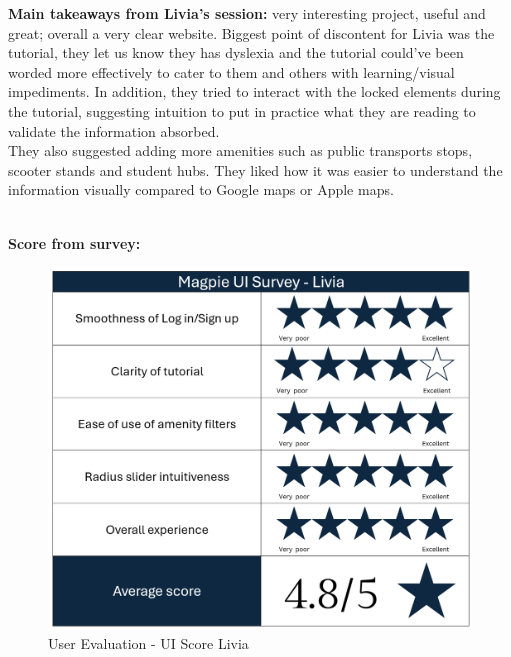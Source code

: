 \noindent\textbf{Main takeaways from Livia's session: }very interesting project, useful and great; overall a very clear website. Biggest point of discontent for Livia was the tutorial, they let us know they has dyslexia and the tutorial could've been worded more effectively to cater to them and others with learning/visual impediments. In addition, they tried to interact with the locked elements during the tutorial, suggesting intuition to put in practice what they are reading to validate the information absorbed.\\
They also suggested adding more amenities such as public transports stops, scooter stands and student hubs. They liked how it was easier to understand the information visually compared to Google maps or Apple maps.\\ \\

\newpage{}

\textbf{Score from survey: }
\begin{figure}[h!]
    \centering
    \includegraphics[width=\textwidth]{images/survey-livia.png}
    \caption{User Evaluation - UI Score Livia}
\end{figure}

\newpage
